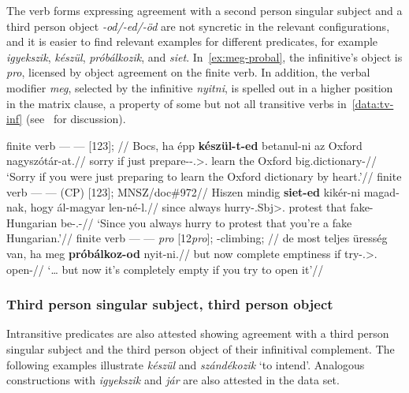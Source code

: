 The verb forms expressing agreement with a second person singular subject and a
third person object \emph{-od/-ed/-öd} are not syncretic in the relevant
configurations, and it is easier to find relevant examples for different
predicates, for example \emph{igyekszik}, \emph{készül}, \emph{próbálkozik},
and \emph{siet}. In~\eqref{ex:meg-probal}, the infinitive's object is
\emph{pro}, licensed by object agreement on the finite verb. In addition, the
verbal modifier \emph{meg}, selected by the infinitive \emph{nyitni}, is
spelled out in a higher position in the matrix clause, a property of some but
not all transitive verbs in~\eqref{data:tv-inf}
(see~\citealt[18--22]{EKissvanRie2004b} for discussion).

\ex\label{ex:oxford-keszul}%
    \begingl
        \glpreamble finite verb --- \Inf{} --- \Obj{} [123]; //
        \gla 	Bocs, ha épp \textbf{készül-t-ed} betanul-ni az Oxford nagyszótár-at.//
        \glb 	sorry if just prepare-\Pst-\Ssg.\Sbj>\Third.\Obj{} learn the Oxford big.dictionary-\Acc//
        \glft 	\enquote*{Sorry if you were just preparing to learn the Oxford dictionary by heart.}\trailingcitation{}//
    \endgl
\xe
\ex\label{ex:siet-almagyar}
    \begingl
        \glpreamble finite verb --- \Inf{} --- \Obj{} (CP) [123]; \gls{MNSZ}/doc\#972//
        \gla 	Hiszen mindig \textbf{siet-ed} {kikér-ni magad-nak}, hogy ál-magyar len-né-l.//
        \glb 	since always hurry-\Tsg.Sbj>\Tsg.\Obj{} protest that fake-Hungarian be-\Cond.\Tsg-\Sbj{}//
        \glft 	\enquote*{Since you always hurry to protest that you're a fake Hungarian.}//
    \endgl
\xe
\ex\label{ex:meg-probal}%
    \begingl
        \glpreamble finite verb --- \Inf{} --- \emph{pro} [12\emph{pro}]; \Vm{}-climbing; //
        \gla 	\nogloss{\dots} de most teljes üresség van, ha meg
        \textbf{próbálkoz-od} nyit-ni.//
        \glb 	but now complete emptiness \Cop{} if \Vm{} try-\Ssg.\Sbj>\Third.\Obj{} open-\Inf{}//
        \glft 	\enquote*{\dots{} but now it's completely empty if you try to open it}\trailingcitation{}//
    \endgl
\xe

\subsubsection{Third person singular subject, third person object}\label{sub:3-3}

Intransitive predicates are also attested showing agreement with a third person
singular subject and the third person object of their infinitival complement.
The following examples illustrate \emph{készül} and \emph{szándékozik}
\enquote*{to intend}. Analogous constructions with \emph{igyekszik} and
\emph{jár} are also attested in the data set.

